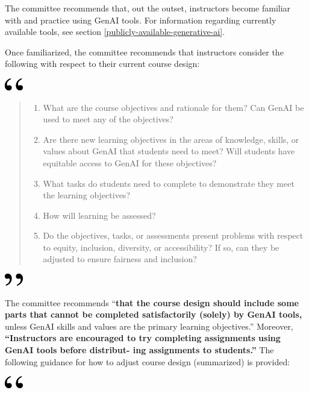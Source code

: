 \documentclass[
]{book}
\begin{document}
The committee recommends that, out the outset, instructors become familiar with and practice using GenAI tools. For information regarding currently available tools, see section \ref{publicly-available-generative-ai}.

Once familiarized, the committee recommends that instructors consider the following with respect to their current course design:

\includegraphics[width=0.3125in,height=0.20833in]{open.png}

\begin{quote}
\begin{enumerate}
\def\labelenumi{\arabic{enumi}.}
\item
  What are the course objectives and rationale for them? Can GenAI be used to meet any of the objectives?
\item
  Are there new learning objectives in the areas of knowledge, skills, or values about GenAI that students need to meet? Will students have equitable access to GenAI for these objectives?
\item
  What tasks do students need to complete to demonstrate they meet the learning objectives?
\item
  How will learning be assessed?
\item
  Do the objectives, tasks, or assessments present problems with respect to equity, inclusion, diversity, or accessibility? If so, can they be adjusted to ensure fairness and inclusion?
\end{enumerate}
\end{quote}

\includegraphics[width=0.3125in,height=0.20833in]{close.png}

The committee recommends ``\textbf{that the course design should include some parts that cannot be completed satisfactorily (solely) by GenAI tools,} unless GenAI skills and values are the primary learning objectives.'' Moreover, \textbf{``Instructors are encouraged to try completing assignments using GenAI tools before distribut- ing assignments to students.''} The following guidance for how to adjust course design (summarized) is provided:

\includegraphics[width=0.3125in,height=0.20833in]{open.png}
\end{document}
